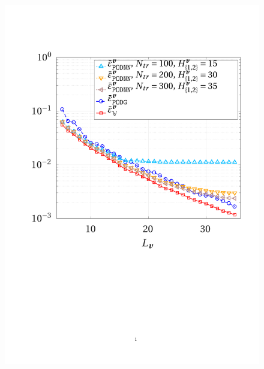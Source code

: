 \documentclass[12pt, a4paper, twoside, openright, notitlepage]{report}
\numberwithin{equation}{chapter}
\theoremstyle{theorem}
\theoremstyle{definition}
\theoremstyle{remark}
\theoremstyle{proposition}
\numberwithin{figure}{chapter}
\begin{document}
		\begin{figure}[b!]
			\center
			\includegraphics[scale = 0.44, trim = {2cm 9cm 1.5cm 3.5cm}, clip]{dc_200_vel_error_vs_rank}

\end{figure}
\end{document}
